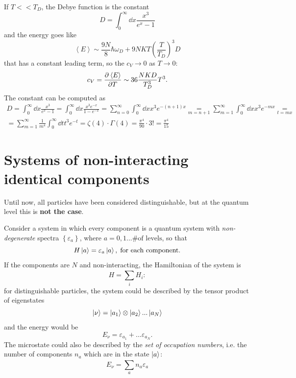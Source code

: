 If $T<<T_D$, the Debye function is the constant
\[
    D = \int_{0}^{\infty} \dd x \frac{x^3}{e^x-1}
\]
and the energy goes like
\[
    \left\langle E\right\rangle \sim \frac{9N}{8}\hbar\omega_D +
    9NKT\left(\frac{T}{T_D}\right)^3D
\]
that has a constant leading term, so the $c_V\to0$ as $T\to0$:
\[
    c_V = \pdv[]{\left\langle E\right\rangle }{T} \sim
    36\frac{NKD}{T_D^3}T^3.
\]
The constant can be computed as
\begin{gather*}
    D = \int_{0}^{\infty} \dd x \frac{x^3}{e^x-1} = 
    \int_{0}^{\infty} \dd x \frac{x^3e^{-x}}{1-e^{-x}}=
    \sum_{n=0}^{\infty} \int_{0}^{\infty} \dd x x^3e^{-(n+1)x} \underset{m=n+1}=
    \sum_{m=1}^{\infty} \int_{0}^{\infty} \dd x x^3e^{-mx} \underset{t=mx}=\\
    =\sum_{m=1}^{\infty} \frac{1}{m^4}\int_{0}^{\infty} \dd t t^3 e^{-t}=
    \zeta(4)\cdot \Gamma(4) = \frac{\pi^4}{90}\cdot 3! = \frac{\pi^4}{15}
\end{gather*}
\section{Systems of non-interacting identical components}
Until now, all particles have been considered distinguishable, but at
the quantum level this is \textbf{not the case}.

Consider a system in which every component is a quantum system with \textit{
non-degenerate} spectra $\left\{\varepsilon_a\right\}$, where $a=0,1...\text{\#
of levels}$, so that
\[
    H\ket{a}=\varepsilon_a\ket{a},\;\text{for each component.}
\]
If the components are $N$ and non-interacting, the Hamiltonian of the system is
\[
    H = \sum_{i}^{} H_i:
\]
for distinguishable particles, the system could be described by the tensor
product of eigenstates
\[
    \ket{\nu}=\ket{a_1}\otimes\ket{a_2}...\ket{a_N}
\]
and the energy would be
\[
    E_\nu = \varepsilon_{a_1}+...\varepsilon_{a_N}.
\]
The microstate could also be described by the \textit{set of occupation numbers},
i.e. the number of components $n_a$ which are in the state $\ket{a}$:
\[
    E_\nu = \sum_{a}^{} n_a\varepsilon_a
\]
